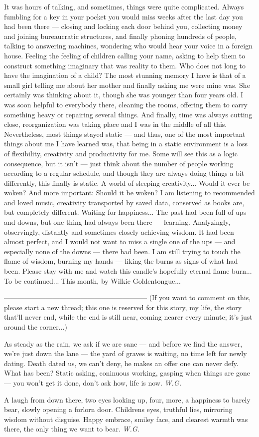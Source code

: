 It was hours of talking, and sometimes, things were quite complicated. Always fumbling for a key in your pocket you would miss weeks after the last day you had been there --- closing and locking each door behind you, collecting money and joining bureaucratic structures, and finally phoning hundreds of people, talking to answering machines, wondering who would hear your voice in a foreign house. 
Feeling the feeling of children calling your name, asking to help them to construct something imaginary that was reality to them. Who does not long to have the imagination of a child? 
The most stunning memory I have is that of a small girl telling me about her mother and finally asking me were mine was. She certainly was thinking about it, though she was younger than four years old. 
I was soon helpful to everybody there, cleaning the rooms, offering them to carry something heavy or repairing several things. And finally, time was always cutting close, reorganization was taking place and I was in the middle of all this. Nevertheless, most things stayed static --- and thus, one of the most important things about me I have learned was, that being in a static environment is a loss of flexibility, creativity and productivity for me. Some will see this as a logic consequence, but it isn't --- just think about the number of people working according to a regular schedule, and though they are always doing things a bit differently, this finally is static. A world of sleeping creativity... 
Would it ever be woken? And more important: Should it be woken? 
I am listening to recommended and loved music, creativity transported by saved data, conserved as books are, but completely different. Waiting for happiness... 
The past had been full of ups and downs, but one thing had always been there --- learning. Analyzingly, observingly, distantly and sometimes closely achieving wisdom. It had been almost perfect, and I would not want to miss a single one of the ups --- and especially none of the downs --- there had been. I am still trying to touch the flame of wisdom, burning my hands --- liking the burns as signs of what had been. 
Please stay with me and watch this candle's hopefully eternal flame burn... 
To be continued...
This month, by Wilkie Goldentongue...

--------------------------------------------------------------
(If you want to comment on this, please start a new thread; this one is reserved for this story, my life, the story that'll never end, while the end is still near, coming nearer every minute; it's just around the corner...)

As steady as the rain, 
we ask if we are sane --- 
and before we find the answer, 
we're just down the lane --- 
the yard of graves is waiting, 
no time left for newly dating. 
Death dated us, we can't deny, 
he makes an offer one can never defy. 
What has been? Static asking, 
coninuous working, gasping 
when things are gone --- 
you won't get it done, 
don't ask how, 
life is now. 
\emph{W.G.}

A laugh from down there, 
two eyes looking up, four, more, 
a happiness to barely bear, 
slowly opening a forlorn door. 
Childrens eyes, 
truthful lies, 
mirroring wisdom
without disguise. 
Happy embrace, 
smiley face, 
and clearest warmth was there, 
the only thing we want to bear. 
\emph{W.G.}
